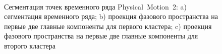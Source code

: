 \begin{figure}[h!t]\center
{}
\\
\caption{Сегментация точек временного ряда Physical~Motion~2: 
a) сегментация временного ряда; b) проекция фазового пространства на первые две главные компоненты для первого кластера; c) проекция фазового пространства на первые две главные компоненты для второго кластера}
\label{fig_real_segmentation}
\end{figure}